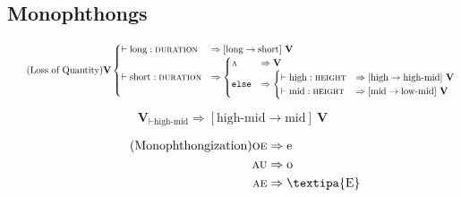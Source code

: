 \documentclass{report}
\begin{document}
\subsection{Monophthongs}

\begin{tcolorbox}[title=Late Latin/Pre-Romance Loss of Quantity]  
  \begin{equation}\tag{Loss of Quantity}\label{loss_of_quantity}
    \textbf{V}
    \begin{cases}
      \vdash \text{long} : \textsc{duration} & \Rightarrow [\text{long} \rightarrow \text{short}]\ \textbf{V} \\
      \vdash \text{short} : \textsc{duration} & \Rightarrow
                                                \begin{cases}
                                                  \textsc{a} & \Rightarrow \textbf{V} \\
                                                  \texttt{else} & \Rightarrow \begin{cases}
                                                                              \vdash \text{high} : \textsc{height} & \Rightarrow [\text{high} \rightarrow \text{high-mid}]\ \textbf{V} \\
                                                                              \vdash \text{mid} : \textsc{height} & \Rightarrow [\text{mid} \rightarrow \text{low-mid}]\ \textbf{V} \\
                                                                            \end{cases} \\
                                                \end{cases} \\
    \end{cases}
  \end{equation}  
\end{tcolorbox}

\begin{tcolorbox}[title=Pan-Romance Great Merger]
  \begin{equation}\tag{Great Merger}\label{eq:great_merger}
    \textbf{V}_{\vdash \text{high-mid}} \Rightarrow [\text{high-mid} \rightarrow \text{mid}]\ \textbf{V}
  \end{equation}
\end{tcolorbox}

\begin{tcolorbox}[title=Monophthongization]
  \begin{align*}\tag{Monophthongization}\label{eq:monophthongization}
    \textsc{oe} & \Rightarrow \text{e} \\
    \textsc{au} & \Rightarrow \text{o} \\
    \textsc{ae} & \Rightarrow \text{\textipa{E}} 
  \end{align*}
\end{tcolorbox}
\end{document}
